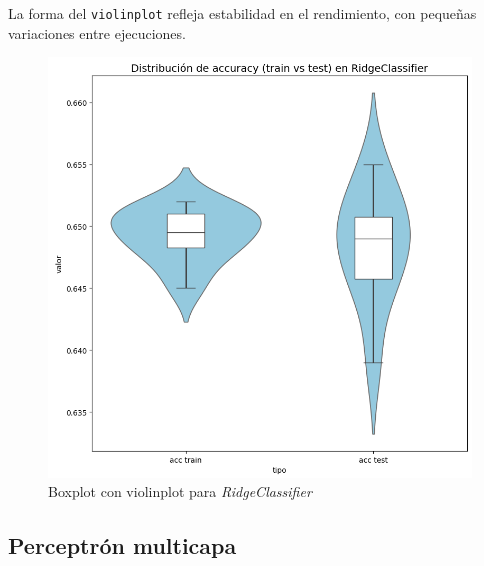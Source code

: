 \vspace{1em}

La forma del \texttt{violinplot} refleja estabilidad en el rendimiento, con pequeñas variaciones entre ejecuciones.

\begin{figure}[H]
	\centering
	\includegraphics[width=1\linewidth]{Imagenes/ridge_bin}
	\caption[Boxplot con violinplot para \textit{RidgeClassifier}]{Boxplot con violinplot para \textit{RidgeClassifier}}
	\label{fig:ridge_bin}
\end{figure}

\subsection{Perceptrón multicapa}
\label{subsec:mlp_bin}

